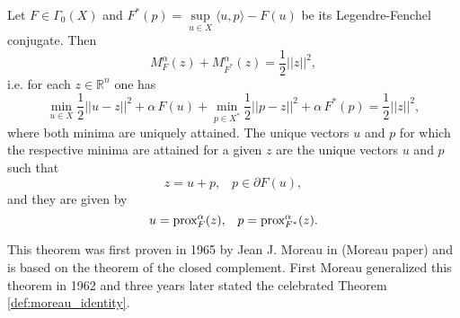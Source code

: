     \begin{theorem} %
    \label{def:moreau_identity}

        Let $F \in \Gamma_{0}(X)$ and $F^{\ast}(p) = \sup\limits_{u \in X} \langle u, p \rangle - F(u)$ be its Legendre-Fenchel conjugate. Then
            \begin{equation}
                M^{\alpha}_{F}(z) + M^{\alpha}_{F^{\ast}}(z) = \frac{1}{2}||z||^{2},
            \end{equation}
        i.e. for each $z \in \mathbb{R}^{n}$ one has
            \begin{equation}
                \min_{u \in X} \frac{1}{2} ||u - z||^{2} +  \alpha \, F(u) + \min_{p \in X^{\ast}} \frac{1}{2} ||p - z||^{2} +  \alpha \, F^{\ast}(p) = \frac{1}{2}||z||^{2},
                \label{eq:moreau_identity}
            \end{equation}
        where both minima are uniquely attained. The unique vectors $u$ and $p$ for which the respective minima are attained for a given $z$ are the unique vectors $u$ and $p$ such that
            \begin{equation}
                z = u + p, \,\,\,\,\, p \in \partial F(u), \label{eq:equivalence_of_moreau_property}
            \end{equation}
        and they are given by
            \begin{equation}
                u = \textnormal{prox}^{\alpha}_{F}(z), \,\,\,\,\, p = \textnormal{prox}^{\alpha}_{F^{\ast}}(z).
            \end{equation}
    \end{theorem}

    This theorem was first proven in 1965 by Jean J. Moreau in (Moreau paper) and is based on the theorem of the closed complement. First Moreau generalized this theorem in 1962 and three years later stated the celebrated Theorem \ref{def:moreau_identity}.


